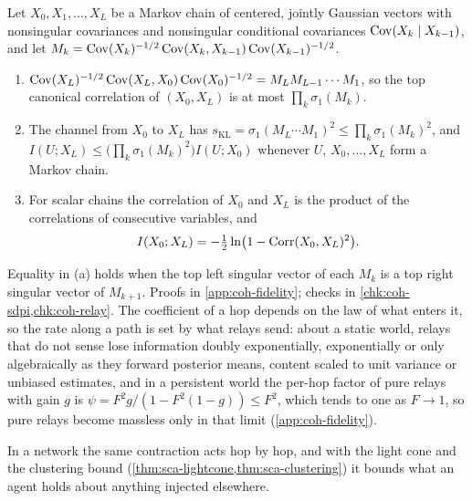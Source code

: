 \begin{proposition}\label{prop:coh-relay}
Let $X_0,X_1,\dots,X_L$ be a Markov chain of centered, jointly Gaussian vectors with nonsingular covariances and nonsingular conditional covariances $\operatorname{Cov}(X_k\mid X_{k-1})$, and let $M_k=\operatorname{Cov}(X_k)^{-1/2}\operatorname{Cov}(X_k,X_{k-1})\operatorname{Cov}(X_{k-1})^{-1/2}$.
\begin{enumerate}\renewcommand{\labelenumi}{(\alph{enumi})}
\item $\operatorname{Cov}(X_L)^{-1/2}\operatorname{Cov}(X_L,X_0)\operatorname{Cov}(X_0)^{-1/2}=M_LM_{L-1}\cdots M_1$, so the top canonical correlation of $(X_0,X_L)$ is at most $\prod_k\sigma_1(M_k)$.
\item The channel from $X_0$ to $X_L$ has $s_{\mathrm{KL}}=\sigma_1(M_L\cdots M_1)^2\le\prod_k\sigma_1(M_k)^2$, and $I(U;X_L)\le\bigl(\prod_k\sigma_1(M_k)^2\bigr)I(U;X_0)$ whenever $U$, $X_0,\dots,X_L$ form a Markov chain.
\item For scalar chains the correlation of $X_0$ and $X_L$ is the product of the correlations of consecutive variables, and
\[ I(X_0;X_L)=-\tfrac12\ln\bigl(1-\operatorname{Corr}(X_0,X_L)^2\bigr). \]
\end{enumerate}
\end{proposition}

Equality in (a) holds when the top left singular vector of each $M_k$ is a top right singular vector of $M_{k+1}$. Proofs in \cref{app:coh-fidelity}; checks in \cref{chk:coh-sdpi,chk:coh-relay}. The coefficient of a hop depends on the law of what enters it, so the rate along a path is set by what relays send: about a static world, relays that do not sense lose information doubly exponentially, exponentially or only algebraically as they forward posterior means, content scaled to unit variance or unbiased estimates, and in a persistent world the per-hop factor of pure relays with gain $g$ is $\psi=F^2g/(1-F^2(1-g))\le F^2$, which tends to one as $F\to1$, so pure relays become massless only in that limit (\cref{app:coh-fidelity}).

In a network the same contraction acts hop by hop, and with the light cone and the clustering bound (\cref{thm:sca-lightcone,thm:sca-clustering}) it bounds what an agent holds about anything injected elsewhere.

